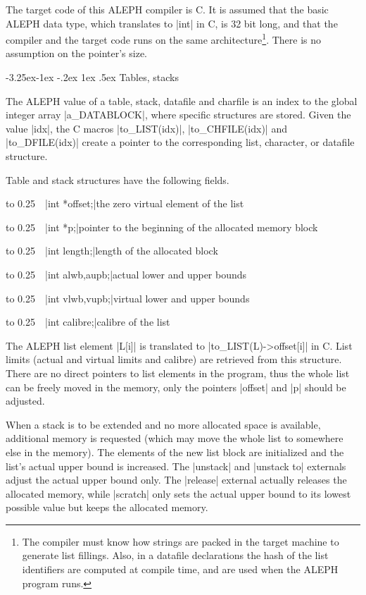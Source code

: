 \documentclass{article}
\makeatletter
\newcommand\A{{\sf ALEPH}}
\newcommand\g[1]{{\sf #1}}
\renewcommand\subsection{%
\@startsection{subsection}{2}{\z@}%
   {-3.25ex\@plus -1ex \@minus -.2ex}%
   {1ex \@plus .5ex}%
   {\normalfont\normalsize\bfseries}}
\makeatother
\begin{document}
The target code of this \A{} compiler is {\sf C}. It is assumed that the
basic \A{} data type, which translates to \pp|int| in {\sf C}, is 32 bit long,
and that the compiler and the target code runs on the same
architecture\footnote{The compiler must know how strings are packed in the
target machine to generate list fillings. Also, in a datafile declarations the
hash of the list identifiers are computed at compile
time, and are used when the \A{} program runs.}. There is no assumption on
the pointer's size.

\subsection{Tables, stacks}\label{subsec:tables-stacks}

The \A{} value of a \g{table}, \g{stack}, \g{datafile} and \g{charfile} is
an index to the global integer array \pp|a\_DATABLOCK|, where specific 
structures are stored. Given the value \pp|idx|, the {\sf C} macros
\pp|to\_LIST(idx)|, \pp|to\_CHFILE(idx)| and \pp|to\_DFILE(idx)| create a
pointer to the corresponding list, character, or datafile structure.

Table and stack structures have the following fields.
\def\HH{\noindent\hbox to 0.25\linewidth\bgroup~~}

\medskip

\HH\pp|int *offset;|\HE the zero virtual element of the list

\HH\pp|int *p;|\HE  pointer to the beginning of the allocated memory block

\HH\pp|int length;|\HE length of the allocated block

\HH\pp|int alwb,aupb;|\HE actual lower and upper bounds

\HH\pp|int vlwb,vupb;|\HE virtual lower and upper bounds

\HH\pp|int calibre;|\HE  calibre of the list

\smallskip
\noindent
The \A{} list element \pp|L[i]| is translated to \pp|to\_LIST(L)->offset[i]|
in {\sf C}. List limits (actual and virtual limits and calibre) are
retrieved from this structure. There are no direct pointers to list elements
in the program, thus the whole list can be freely moved in the memory, only the
pointers \pp|offset| and \pp|p| should be adjusted.

When a stack is to be extended and no more allocated space is available,
additional memory is requested (which may move the whole list to somewhere
else in the memory). The elements of the new list block are initialized
and the list's actual upper bound is increased. The \pp|unstack| and
\pp|unstack to| externals adjust the actual upper bound only. The
\pp|release| external actually releases the allocated memory, while
\pp|scratch| only sets the actual upper bound to its lowest possible value
but keeps the allocated memory.
\end{document}
